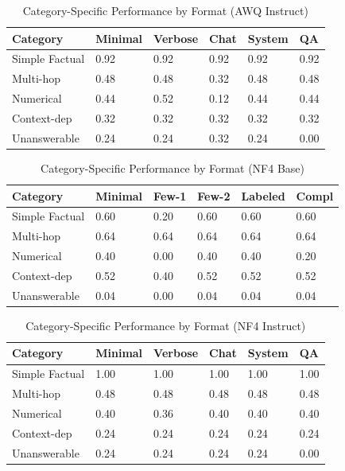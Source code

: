 \documentclass[11pt,a4paper]{article}
\begin{document}
\begin{table}[H]
\centering
\caption{Category-Specific Performance by Format (AWQ Instruct)}
\small
\begin{tabularx}{\textwidth}{@{}X C{1.4cm} C{1.4cm} C{1.4cm} C{1.4cm} C{1.4cm}@{}}
\toprule
\textbf{Category} & \textbf{Minimal} & \textbf{Verbose} & \textbf{Chat} & \textbf{System} & \textbf{QA} \\
\midrule
Simple Factual & 0.92 & 0.92 & 0.92 & 0.92 & 0.92 \\
Multi-hop & 0.48 & 0.48 & 0.32 & 0.48 & 0.48 \\
Numerical & 0.44 & 0.52 & 0.12 & 0.44 & 0.44 \\
Context-dep & 0.32 & 0.32 & 0.32 & 0.32 & 0.32 \\
Unanswerable & 0.24 & 0.24 & 0.32 & 0.24 & 0.00 \\
\bottomrule
\end{tabularx}
\end{table}

\begin{table}[H]
\centering
\caption{Category-Specific Performance by Format (NF4 Base)}
\small
\begin{tabularx}{\textwidth}{@{}X C{1.4cm} C{1.4cm} C{1.4cm} C{1.4cm} C{1.4cm}@{}}
\toprule
\textbf{Category} & \textbf{Minimal} & \textbf{Few-1} & \textbf{Few-2} & \textbf{Labeled} & \textbf{Compl} \\
\midrule
Simple Factual & 0.60 & 0.20 & 0.60 & 0.60 & 0.60 \\
Multi-hop & 0.64 & 0.64 & 0.64 & 0.64 & 0.64 \\
Numerical & 0.40 & 0.00 & 0.40 & 0.40 & 0.20 \\
Context-dep & 0.52 & 0.40 & 0.52 & 0.52 & 0.52 \\
Unanswerable & 0.04 & 0.00 & 0.04 & 0.04 & 0.04 \\
\bottomrule
\end{tabularx}
\end{table}

\begin{table}[H]
\centering
\caption{Category-Specific Performance by Format (NF4 Instruct)}
\small
\begin{tabularx}{\textwidth}{@{}X C{1.4cm} C{1.4cm} C{1.4cm} C{1.4cm} C{1.4cm}@{}}
\toprule
\textbf{Category} & \textbf{Minimal} & \textbf{Verbose} & \textbf{Chat} & \textbf{System} & \textbf{QA} \\
\midrule
Simple Factual & 1.00 & 1.00 & 1.00 & 1.00 & 1.00 \\
Multi-hop & 0.48 & 0.48 & 0.48 & 0.48 & 0.48 \\
Numerical & 0.40 & 0.36 & 0.40 & 0.40 & 0.40 \\
Context-dep & 0.24 & 0.24 & 0.24 & 0.24 & 0.24 \\
Unanswerable & 0.24 & 0.24 & 0.24 & 0.24 & 0.00 \\
\bottomrule
\end{tabularx}
\end{table}
\end{document}

